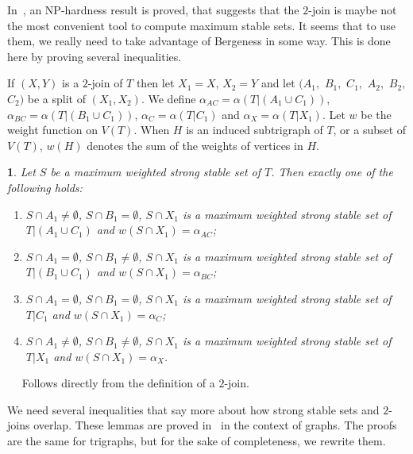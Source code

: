 \documentclass[11 pt] {article}
\newcommand\blackslug{\hbox{\hskip 1pt \vrule width 4pt height 8pt depth 1.5pt
        \hskip 1pt}}
\newcommand\bbox{\hfill \quad \blackslug \medbreak}
\newtheorem{lemma}[theorem]{}
\newcounter{claim}
\newcommand{\Proof}{\setcounter{claim}{0}\noindent{\bf Proof.}\ \ }
\begin{document}
In~\cite{nicolas.kristina:2-join}, an NP-hardness result is proved,
that suggests that the $2$-join is maybe not the most convenient tool to
compute maximum stable sets.  It seems that to use them, we really
need to take advantage of Bergeness in some way.  This is done here by
proving several inequalities.

If $(X, Y)$ is a $2$-join of $T$ then let $X_1=X$, $X_2=Y$ and let
$(A_1,$ $B_1,$ $C_1,$ $A_2,$ $B_2,$ $C_2)$ be a split of $(X_1, X_2)$.
We define $\alpha_{AC} = \alpha(T|({A_1 \cup C_1}))$, $\alpha_{BC} =
\alpha(T|(B_1 \cup C_1))$, $\alpha_{C}= \alpha(T|C_1)$ and $\alpha_{X}
= \alpha(T|X_1)$.  Let $w$ be the weight function on $V(T)$.  When $H$
is an induced subtrigraph of $T$, or a subset of $V(T)$, $w(H)$
denotes the sum of the weights of vertices in $H$.


\begin{lemma}
  \label{l:4cases}
  Let $S$ be a maximum weighted strong stable set of $T$. Then exactly
  one of the following holds:

  \begin{enumerate}
  \item\label{i:4c1} $S \cap A_1 \neq \emptyset$, $S \cap B_1 =
    \emptyset$, $S\cap X_1$ is a maximum weighted strong stable set of $T| (A_1
    \cup C_1)$ and $w(S \cap X_1) = \alpha_{AC}$;
  \item\label{i:4c2} $S \cap A_1 = \emptyset$, $S \cap B_1 \neq
    \emptyset$, $S\cap X_1$ is a maximum weighted strong stable set of $T| (B_1
    \cup C_1)$ and $w(S \cap X_1) = \alpha_{BC}$;
  \item\label{i:4c3} $S \cap A_1 = \emptyset$, $S \cap B_1 =
    \emptyset$, $S\cap X_1$ is a maximum weighted strong stable set of
    $T|C_1$ and $w(S \cap X_1) = \alpha_{C}$;
  \item\label{i:4c4} $S \cap A_1 \neq \emptyset$, $S \cap B_1 \neq
    \emptyset$, $S\cap X_1$ is a maximum weighted strong stable set of
    $T|X_1$ and $w(S \cap X_1) = \alpha_{X}$.
  \end{enumerate}
\end{lemma}

\Proof
  Follows directly from the definition of a $2$-join.
\bbox

We need several inequalities that say more about how strong stable
sets and $2$-joins overlap.  These lemmas are proved
in~\cite{nicolas.kristina:2-join} in the context of graphs.  The
proofs are the same for trigraphs, but for the sake of
completeness, we rewrite them.
\end{document}
